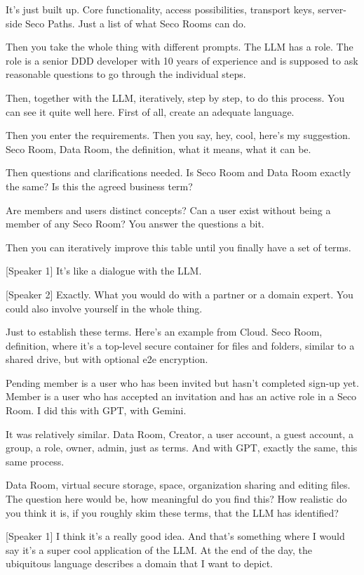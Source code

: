 It's just built up. Core functionality, access possibilities, transport keys, server-side Seco Paths. Just a list of what Seco Rooms can do.

Then you take the whole thing with different prompts. The LLM has a role. The role is a senior DDD developer with 10 years of experience and is supposed to ask reasonable questions to go through the individual steps.

Then, together with the LLM, iteratively, step by step, to do this process. You can see it quite well here. First of all, create an adequate language.

Then you enter the requirements. Then you say, hey, cool, here's my suggestion. Seco Room, Data Room, the definition, what it means, what it can be.

Then questions and clarifications needed. Is Seco Room and Data Room exactly the same? Is this the agreed business term?

Are members and users distinct concepts? Can a user exist without being a member of any Seco Room? You answer the questions a bit.

Then you can iteratively improve this table until you finally have a set of terms.

[Speaker 1]
It's like a dialogue with the LLM.

[Speaker 2]
Exactly. What you would do with a partner or a domain expert. You could also involve yourself in the whole thing.

Just to establish these terms. Here's an example from Cloud. Seco Room, definition, where it's a top-level secure container for files and folders, similar to a shared drive, but with optional e2e encryption.

Pending member is a user who has been invited but hasn't completed sign-up yet. Member is a user who has accepted an invitation and has an active role in a Seco Room. I did this with GPT, with Gemini.

It was relatively similar. Data Room, Creator, a user account, a guest account, a group, a role, owner, admin, just as terms. And with GPT, exactly the same, this same process.

Data Room, virtual secure storage, space, organization sharing and editing files. The question here would be, how meaningful do you find this? How realistic do you think it is, if you roughly skim these terms, that the LLM has identified?

[Speaker 1]
I think it's a really good idea. And that's something where I would say it's a super cool application of the LLM. At the end of the day, the ubiquitous language describes a domain that I want to depict.

